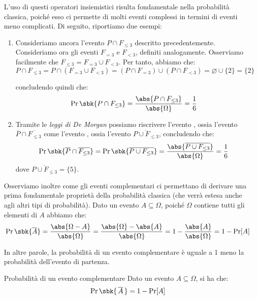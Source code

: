 \documentclass[a4paper, 12pt]{report}
\begin{document}
    L'uso di questi operatori insiemistici risulta fondamentale nella probabilità classica, poiché esso ci permette di  molti eventi complessi in termini di eventi meno complicati. Di seguito, riportiamo due esempi:
    \begin{enumerate}
            \item Consideriamo ancora l'evento $P \cap F_{\leq 3}$ descritto precedentemente. Consideriamo ora gli eventi $F_{= 3}$ e $F_{< 3}$, definiti analogamente. Osserviamo facilmente che $F_{\leq 3} = F_{= 3} \cup F_{< 3}$. Per tanto, abbiamo che:
            \[P \cap F_{\leq 3} = P \cap (F_{= 3} \cup F_{< 3}) = (P \cap F_{= 3}) \cup (P \cap F_{< 3}) = \varnothing \cup \{2\} = \{2\}\]

            concludendo quindi che:
            \[\Pr \sbk{P \cap F_{\leq 3}} = \frac{\abs{P \cap F_{\leq 3}}}{\abs{\Omega}} = \frac{1}{6}\]

            \item Tramite le \textit{leggi di De Morgan} possiamo riscrivere l'evento , ossia l'evento $\overline{P} \cap \overline{F_{\leq 3}}$ come l'evento , ossia l'evento $\overline{P \cup F_{\leq 3}}$, concludendo che:
            \[\Pr \sbk{\overline{P} \cap \overline{F_{\leq 3}}} = \Pr \sbk{\overline{P \cup F_{\leq 3}}} = \frac{\abs{\overline{P \cup F_{\leq 3}}}}{\abs{\Omega}} = \frac{1}{6}\]
            dove $\overline{P \cup F_{\leq 3}} = \{5\}$.
    \end{enumerate}

    Osserviamo inoltre come gli eventi complementari ci permettano di derivare una prima fondamentale proprietà della probabilità classica (che verrà estesa anche agli altri tipi di probabilità). Dato un evento $A \subseteq \Omega$, poiché $\Omega$ contiene tutti gli elementi di $A$ abbiamo che:
    \[\Pr\sbk{\overline{A}} = \frac{\abs{\Omega - A}}{\abs{\Omega}} = \frac{\abs{\Omega} -\abs{A}}{\abs{\Omega}} = 1 - \frac{\abs{A}}{\abs{\Omega}} = 1 - \Pr[A]\]

    In altre parole, la probabilità di un evento complementare è uguale a 1 meno la probabilità dell'evento di partenza.

    \begin{framedthm}{Probabilità di un evento complementare}
        Dato un evento $A \subseteq \Omega$, si ha che:
        \[\Pr\sbk{\,\overline{A}\,} = 1- \Pr[A]\]
    \end{framedthm}
\end{document}
